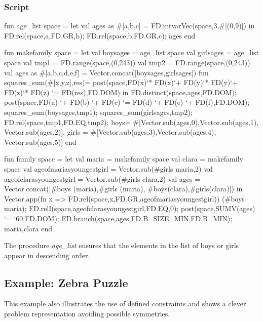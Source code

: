 \documentclass[a4paper,halfparskip]{scrartcl}
\begin{document}
\subsubsection{Script}

\begin{myverbatim}
fun age_list space =
    let
        val ages as #[a,b,c] = FD.intvarVec(space,3,#[(0,9)])
    in 
        FD.rel(space,a,FD.GR,b);
        FD.rel(space,b,FD.GR,c);
        ages
    end

fun makefamily space =
    let
        val boysages  = age_list space
        val girlsages = age_list space
        val tmp1 = FD.range(space,(0,243))
        val tmp2 = FD.range(space,(0,243))
        val ages as #[a,b,c,d,e,f] = 
                Vector.concat([boysages,girlsages])
        fun squares_sum(#[x,y,z],res)= 
            post(space,FD(x)`* FD(x)`+ 
                       FD(y)`* FD(y)`+
                       FD(z)`* FD(z) `= FD(res),FD.DOM)
    in
        FD.distinct(space,ages,FD.DOM);
        post(space,FD(a) `+ FD(b) `+ FD(c) 
                `= FD(d) `+ FD(e) `+ FD(f),FD.DOM);
        squares_sum(boysages,tmp1);
        squares_sum(girlsages,tmp2);
        FD.rel(space,tmp1,FD.EQ,tmp2);
        {boys= #[Vector.sub(ages,0),Vector.sub(ages,1),
                 Vector.sub(ages,2)],
         girls = #[Vector.sub(ages,3),Vector.sub(ages,4),
                   Vector.sub(ages,5)]}
    end

fun family space = 
    let
        val maria = makefamily space
        val clara = makefamily space
        val ageofmariasyoungestgirl = Vector.sub(#girls maria,2)
        val ageofclarasyoungestgirl = Vector.sub(#girls clara,2)
        val ages = Vector.concat([#boys (maria),#girls (maria),
                                  #boys(clara),#girls(clara)])
    in
        Vector.app(fn x => 
              FD.rel(space,x,FD.GR,ageofmariasyoungestgirl))
                  (#boys maria);
        FD.relI(space,ageofclarasyoungestgirl,FD.EQ,0);
        post(space,SUMV(ages) `= `60,FD.DOM);
        FD.branch(space,ages,FD.B_SIZE_MIN,FD.B_MIN);
        {maria,clara}
    end         
 
\end{myverbatim}

The procedure \emph{age\_list} ensures that
the elements in the list of boys or girls appear in 
descending order.



\newpage
\subsection{Example: Zebra Puzzle}
This example also illustrates the use of defined constraints and
shows a clever problem representation avoiding possible symmetries.
\end{document}
